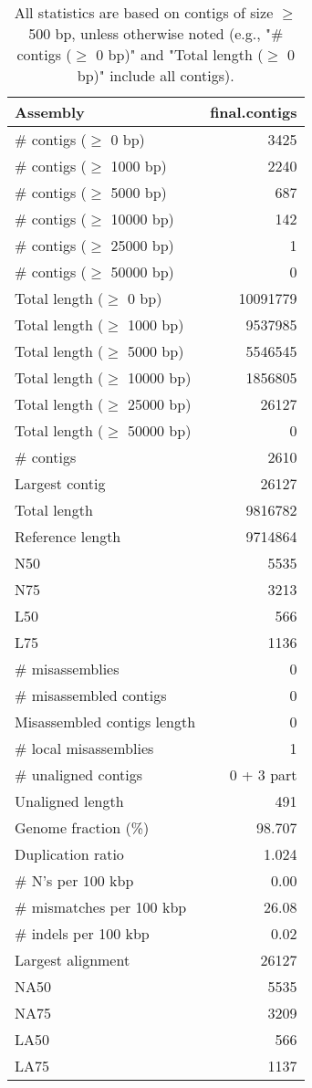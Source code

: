 \documentclass[12pt,a4paper]{article}
\begin{document}
\begin{table}[ht]
\begin{center}
\caption{All statistics are based on contigs of size $\geq$ 500 bp, unless otherwise noted (e.g., "\# contigs ($\geq$ 0 bp)" and "Total length ($\geq$ 0 bp)" include all contigs).}
\begin{tabular}{|l*{1}{|r}|}
\hline
Assembly & final.contigs \\ \hline
\# contigs ($\geq$ 0 bp) & 3425 \\ \hline
\# contigs ($\geq$ 1000 bp) & 2240 \\ \hline
\# contigs ($\geq$ 5000 bp) & 687 \\ \hline
\# contigs ($\geq$ 10000 bp) & 142 \\ \hline
\# contigs ($\geq$ 25000 bp) & 1 \\ \hline
\# contigs ($\geq$ 50000 bp) & 0 \\ \hline
Total length ($\geq$ 0 bp) & 10091779 \\ \hline
Total length ($\geq$ 1000 bp) & 9537985 \\ \hline
Total length ($\geq$ 5000 bp) & 5546545 \\ \hline
Total length ($\geq$ 10000 bp) & 1856805 \\ \hline
Total length ($\geq$ 25000 bp) & 26127 \\ \hline
Total length ($\geq$ 50000 bp) & 0 \\ \hline
\# contigs & 2610 \\ \hline
Largest contig & 26127 \\ \hline
Total length & 9816782 \\ \hline
Reference length & 9714864 \\ \hline
N50 & 5535 \\ \hline
N75 & 3213 \\ \hline
L50 & 566 \\ \hline
L75 & 1136 \\ \hline
\# misassemblies & 0 \\ \hline
\# misassembled contigs & 0 \\ \hline
Misassembled contigs length & 0 \\ \hline
\# local misassemblies & 1 \\ \hline
\# unaligned contigs & 0 + 3 part \\ \hline
Unaligned length & 491 \\ \hline
Genome fraction (\%) & 98.707 \\ \hline
Duplication ratio & 1.024 \\ \hline
\# N's per 100 kbp & 0.00 \\ \hline
\# mismatches per 100 kbp & 26.08 \\ \hline
\# indels per 100 kbp & 0.02 \\ \hline
Largest alignment & 26127 \\ \hline
NA50 & 5535 \\ \hline
NA75 & 3209 \\ \hline
LA50 & 566 \\ \hline
LA75 & 1137 \\ \hline
\end{tabular}
\end{center}
\end{table}
\end{document}
